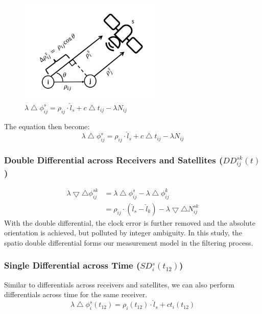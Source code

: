 \documentclass[journal,onecolumn]{IEEEtran}
\begin{document}
\begin{figure}
  \centering
  \captionsetup{justification=centering}
  \includegraphics[width=0.6\textwidth]{fig/sdrx.png}
  \caption{$\lambda \bigtriangleup \phi_{ij}^s = \rho_{ij}\cdot \hat{l}_s + c\bigtriangleup t_{ij} - \lambda N_{ij}$}
  \label{sdrx}
\end{figure}

The equation then become:
\begin{equation}
  \lambda \bigtriangleup \phi_{ij}^s = \rho_{ij}\cdot \hat{l}_s + c\bigtriangleup t_{ij} - \lambda N_{ij}
\end{equation}

\subsubsection{Double Differential across Receivers and Satellites ($DD_{ij}^{sk}(t)$)}
\begin{equation}
  \begin{split}
    \lambda \bigtriangledown \bigtriangleup \phi_{ij}^{sk}
    &= \lambda \bigtriangleup \phi_{ij}^s - \lambda \bigtriangleup \phi_{ij}^k\\
    &= \rho_{ij}\cdot (\hat{l}_s-\hat{l}_k) - \lambda \bigtriangledown \bigtriangleup N_{ij}^{sk}
  \end{split}
\end{equation}
With the double differential, the clock error is further removed and the absolute orientation
is achieved, but polluted by integer ambiguity. In this study, the spatio double differential
forms our measurement model in the filtering process.
\subsubsection{Single Differential across Time ($SD_{i}^{s}(t_{12})$)}
Similar to differentials across receivers and satellites, we can also perform
differentials across time for the same receiver.
\begin{equation}
  \lambda \bigtriangleup \phi_{i}^s(t_{12}) = \rho_i(t_{12}) \cdot \hat{l}_s + ct_i(t_{12})
\end{equation}
\end{document}
